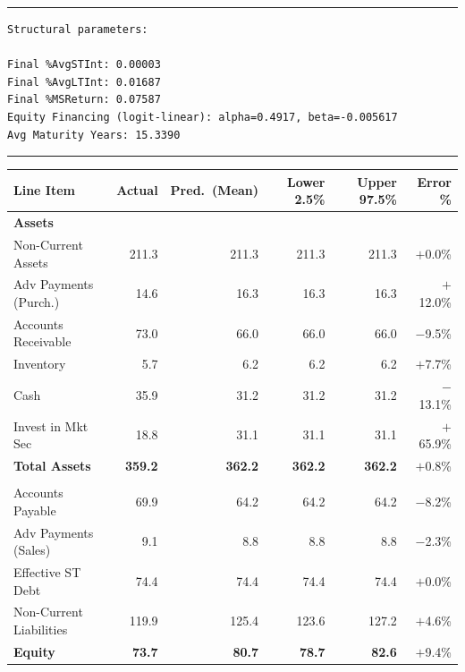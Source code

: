 \documentclass[12pt,a4paper]{article}
\begin{document}
\noindent\rule{\textwidth}{0.4pt}

\begin{lstlisting}[style=console, caption={Trained structural parameters with Bayesian OpEx}, label=lst:params_structural_bayesian]
Structural parameters:

Final %AvgSTInt: 0.00003
Final %AvgLTInt: 0.01687
Final %MSReturn: 0.07587
Equity Financing (logit-linear): alpha=0.4917, beta=-0.005617
Avg Maturity Years: 15.3390
\end{lstlisting}

\noindent\rule{\textwidth}{0.4pt}


\begin{table}[H]
\centering
\footnotesize

\begin{tabular}{l rrrrr}
\toprule
\textbf{Line Item} & \textbf{Actual} & \textbf{Pred.\ (Mean)} & \textbf{Lower 2.5\%} & \textbf{Upper 97.5\%} & \textbf{Error \%} \\
\midrule
\multicolumn{6}{l}{\textbf{Assets}} \\
Non-Current Assets        & 211.3 & 211.3 & 211.3 & 211.3 & $+$0.0\% \\
Adv Payments (Purch.)     &  14.6 &  16.3 &  16.3 &  16.3 & $+$12.0\% \\
Accounts Receivable       &  73.0 &  66.0 &  66.0 &  66.0 & $-$9.5\% \\
Inventory                 &   5.7 &   6.2 &   6.2 &   6.2 & $+$7.7\% \\
Cash                      &  35.9 &  31.2 &  31.2 &  31.2 & $-$13.1\% \\
Invest in Mkt Sec         &  18.8 &  31.1 &  31.1 &  31.1 & $+$65.9\% \\
\textbf{Total Assets}     & \textbf{359.2} & \textbf{362.2} & \textbf{362.2} & \textbf{362.2} & $+$0.8\% \\
\addlinespace
\multicolumn{6}{l}{\textbf{Liabilities}} \\
Accounts Payable          &  69.9 &  64.2 &  64.2 &  64.2 & $-$8.2\% \\
Adv Payments (Sales)      &   9.1 &   8.8 &   8.8 &   8.8 & $-$2.3\% \\
Effective ST Debt         &  74.4 &  74.4 &  74.4 &  74.4 & $+$0.0\% \\
Non-Current Liabilities   & 119.9 & 125.4 & 123.6 & 127.2 & $+$4.6\% \\
\textbf{Equity}           & \textbf{73.7} & \textbf{80.7} & \textbf{78.7} & \textbf{82.6} & $+$9.4\% \\

\end{tabular}
\end{table}
\end{document}
